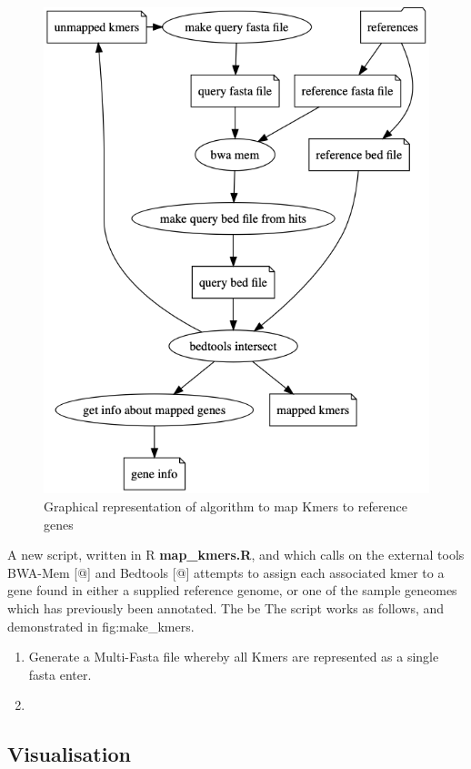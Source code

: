 \documentclass[]{DissertateUSU}
\begin{document}
\begin{figure}
\centering
\includegraphics{_static/map_kmers.png}
\caption{\label{fig:make_kmers}Graphical representation of algorithm to
map Kmers to reference genes}
\end{figure}

A new script, written in R \textbf{map\_kmers.R}, and which calls on the
external tools BWA-Mem {[}@{]} and Bedtools {[}@{]} attempts to assign
each associated kmer to a gene found in either a supplied reference
genome, or one of the sample geneomes which has previously been
annotated. The be The script works as follows, and demonstrated in
fig:make\_kmers.

\begin{enumerate}
\def\labelenumi{\arabic{enumi}.}
\item
  Generate a Multi-Fasta file whereby all Kmers are represented as a
  single fasta enter.
\item
\end{enumerate}

\hypertarget{visualisation}{%
\subsection{Visualisation}\label{visualisation}}
\end{document}
